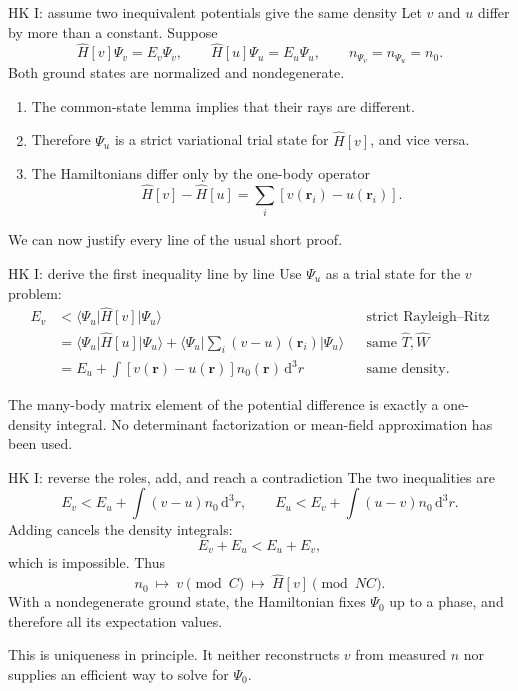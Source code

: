 \documentclass[aspectratio=169,10pt]{beamer}
\newcommand{\mbbox}[1]{\begin{tcolorbox}[colback=paleblue,colframe=uioblue,title={Many-body connection}]#1\end{tcolorbox}}
\newcommand{\dftbox}[1]{\begin{tcolorbox}[colback=paleteal,colframe=teal,title={Key result}]#1\end{tcolorbox}}
\newcommand{\dd}{\,\mathrm d}
\newcommand{\rr}{\mathbf r}
\newcommand{\ket}[1]{\lvert #1\rangle}
\newcommand{\bra}[1]{\langle #1\rvert}
\begin{document}
\begin{frame}{HK I: assume two inequivalent potentials give the same density}
Let $v$ and $u$ differ by more than a constant. Suppose
\[
 \hat H[v]\Psi_v=E_v\Psi_v,\qquad
 \hat H[u]\Psi_u=E_u\Psi_u,\qquad n_{\Psi_v}=n_{\Psi_u}=n_0.
\]
Both ground states are normalized and nondegenerate.
\begin{enumerate}
\item The common-state lemma implies that their rays are different.
\item Therefore $\Psi_u$ is a strict variational trial state for $\hat H[v]$,
and vice versa.
\item The Hamiltonians differ only by the one-body operator
\[
 \hat H[v]-\hat H[u]=\sum_i[v(\rr_i)-u(\rr_i)].
\]
\end{enumerate}
We can now justify every line of the usual short proof.
\end{frame}

\begin{frame}{HK I: derive the first inequality line by line}
Use $\Psi_u$ as a trial state for the $v$ problem:
\begin{align*}
 E_v
 &<\bra{\Psi_u}\hat H[v]\ket{\Psi_u}
 &&\text{strict Rayleigh--Ritz}\\[1mm]
 &=\bra{\Psi_u}\hat H[u]\ket{\Psi_u}
       +\bra{\Psi_u}\sum_i(v-u)(\rr_i)\ket{\Psi_u}
 &&\text{same }\hat T,\hat W\\[1mm]
 &=E_u+\int[v(\rr)-u(\rr)]n_0(\rr)\dd^3r
 &&\text{same density}.
\end{align*}
\dftbox{The many-body matrix element of the potential difference is exactly
a one-density integral. No determinant factorization or mean-field
approximation has been used.}
\end{frame}

\begin{frame}{HK I: reverse the roles, add, and reach a contradiction}
The two inequalities are
\[
 E_v<E_u+\int(v-u)n_0\dd^3r,
 \qquad E_u<E_v+\int(u-v)n_0\dd^3r.
\]
Adding cancels the density integrals:
\[
 E_v+E_u<E_u+E_v,
\]
which is impossible. Thus
\[
 \boxed{n_0\ \longmapsto\ v\pmod C\ \longmapsto\ \hat H[v]\pmod{NC}.}
\]
With a nondegenerate ground state, the Hamiltonian fixes $\Psi_0$ up to a
phase, and therefore all its expectation values.
\mbbox{This is uniqueness in principle. It neither reconstructs $v$ from
measured $n$ nor supplies an efficient way to solve for $\Psi_0$.}
\end{frame}
\end{document}
